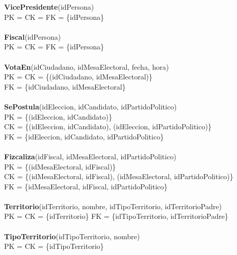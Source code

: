 \textbf{VicePresidente}(idPersona)\\
  PK = CK = FK = \{idPersona\}\\
\\
\textbf{Fiscal}(idPersona)\\
  PK = CK = FK = \{idPersona\}\\
\\
\textbf{VotaEn}(idCiudadano, idMesaElectoral, fecha, hora)\\
  PK = CK = \{(idCiudadano, idMesaElectoral)\}\\
  FK = \{idCiudadano, idMesaElectoral\}\\
\\
\textbf{SePostula}(idEleccion, idCandidato, idPartidoPolitico)\\
  PK = \{(idEleccion, idCandidato)\}\\
  CK = \{(idEleccion, idCandidato), (idEleccion, idPartidoPolitico)\}\\
  FK = \{idEleccion, idCandidato, idPartidoPolitico\}\\
\\
\textbf{Fizcaliza}(idFiscal, idMesaElectoral, idPartidoPolitico)\\
  PK = \{(idMesaElectoral, idFiscal)\}\\
  CK = \{(idMesaElectoral, idFiscal), (idMesaElectoral, idPartidoPolitico)\}\\
  FK = \{idMesaElectoral, idFiscal, idPartidoPolitico\}\\
\\
\textbf{Territorio}(idTerritorio, nombre, idTipoTerritorio, idTerritorioPadre)\\
  PK = CK = \{idTerritorio\}
  FK = \{idTipoTerritorio, idTerritorioPadre\}\\
\\
\textbf{TipoTerritorio}(idTipoTerritorio, nombre)\\
  PK = CK = \{idTipoTerritorio\}\\	